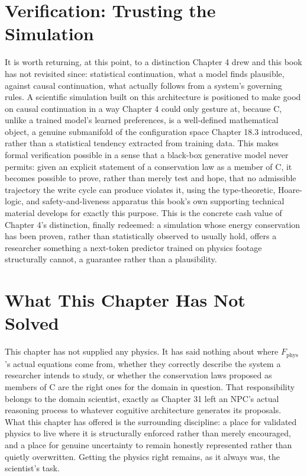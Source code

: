\section{Verification: Trusting the Simulation}

It is worth returning, at this point, to a distinction Chapter 4 drew and this book has not revisited since: statistical continuation, what a model finds plausible, against causal continuation, what actually follows from a system's governing rules. A scientific simulation built on this architecture is positioned to make good on causal continuation in a way Chapter 4 could only gesture at, because C, unlike a trained model's learned preferences, is a well-defined mathematical object, a genuine submanifold of the configuration space Chapter 18.3 introduced, rather than a statistical tendency extracted from training data. This makes formal verification possible in a sense that a black-box generative model never permits: given an explicit statement of a conservation law as a member of C, it becomes possible to prove, rather than merely test and hope, that no admissible trajectory the write cycle can produce violates it, using the type-theoretic, Hoare-logic, and safety-and-liveness apparatus this book's own supporting technical material develops for exactly this purpose. This is the concrete cash value of Chapter 4's distinction, finally redeemed: a simulation whose energy conservation has been proven, rather than statistically observed to usually hold, offers a researcher something a next-token predictor trained on physics footage structurally cannot, a guarantee rather than a plausibility.

\section{What This Chapter Has Not Solved}

This chapter has not supplied any physics. It has said nothing about where \(F_{\mathrm{phys}}\)'s actual equations come from, whether they correctly describe the system a researcher intends to study, or whether the conservation laws proposed as members of C are the right ones for the domain in question. That responsibility belongs to the domain scientist, exactly as Chapter 31 left an NPC's actual reasoning process to whatever cognitive architecture generates its proposals. What this chapter has offered is the surrounding discipline: a place for validated physics to live where it is structurally enforced rather than merely encouraged, and a place for genuine uncertainty to remain honestly represented rather than quietly overwritten. Getting the physics right remains, as it always was, the scientist's task.


